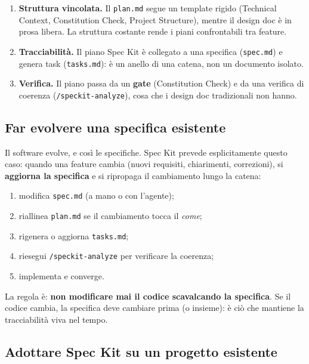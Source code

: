 \documentclass[
  italian,
  10pt,
]{book}
\providecommand{\tightlist}{%
  \setlength{\itemsep}{0pt}\setlength{\parskip}{0pt}}
\begin{document}
\begin{enumerate}
\def\labelenumi{\arabic{enumi}.}
\tightlist
\item
  \textbf{Struttura vincolata.} Il \texttt{plan.md} segue un template
  rigido (Technical Context, Constitution Check, Project Structure),
  mentre il design doc è in prosa libera. La struttura costante rende i
  piani confrontabili tra feature.
\item
  \textbf{Tracciabilità.} Il piano Spec Kit è collegato a una specifica
  (\texttt{spec.md}) e genera task (\texttt{tasks.md}): è un anello di
  una catena, non un documento isolato.
\item
  \textbf{Verifica.} Il piano passa da un \textbf{gate} (Constitution
  Check) e da una verifica di coerenza (\texttt{/speckit-analyze}), cosa
  che i design doc tradizionali non hanno.
\end{enumerate}

\subsection{Far evolvere una specifica
esistente}\label{far-evolvere-una-specifica-esistente}

Il software evolve, e così le specifiche. Spec Kit prevede
esplicitamente questo caso: quando una feature cambia (nuovi requisiti,
chiarimenti, correzioni), si \textbf{aggiorna la specifica} e si
ripropaga il cambiamento lungo la catena:

\begin{enumerate}
\def\labelenumi{\arabic{enumi}.}
\tightlist
\item
  modifica \texttt{spec.md} (a mano o con l'agente);
\item
  riallinea \texttt{plan.md} se il cambiamento tocca il \emph{come};
\item
  rigenera o aggiorna \texttt{tasks.md};
\item
  riesegui \texttt{/speckit-analyze} per verificare la coerenza;
\item
  implementa e converge.
\end{enumerate}

La regola è: \textbf{non modificare mai il codice scavalcando la
specifica}. Se il codice cambia, la specifica deve cambiare prima (o
insieme): è ciò che mantiene la tracciabilità viva nel tempo.

\subsection{Adottare Spec Kit su un progetto
esistente}\label{adottare-spec-kit-su-un-progetto-esistente}
\end{document}
